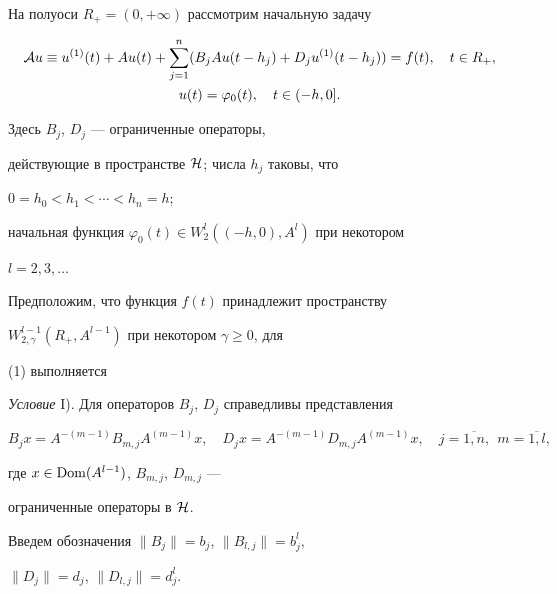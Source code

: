 На полуоси $R_+=(0,+\infty )$ рассмотрим начальную задачу


\begin{gather}


{\pA}u\equiv u^{(1)}(t)+Au(t)+\sum\limits_{j=1}^n( B_j


Au(t-h_j)+D_ju^{(1)}(t-h_j))


=f(t), \quad t\in R_+, \\


%


u(t)=\varphi_0(t), \quad t\in (-h,0].


\end{gather}


Здесь $B_j$, $D_j$ --- ограниченные операторы,


действующие в пространстве ${\cal H}$; числа $h_j$ таковы, что


$0=h_0< h_1< \dotsb <h_n=h$;


начальная функция $\varphi_0(t)\in W^l_2((-h,0),A^l)$ при некотором


$l=2,3,\dotsc$





Предположим, что функция $f(t)$ принадлежит пространству


$W^{l-1}_{2,\gamma}(R_+,A^{l-1})$ при некотором $\gamma \geq 0$, для


(1) выполняется


\medskip





{\it Условие} I). Для операторов $B_j$, $D_j$ справедливы представления


$$


B_{j}x=A^{-(m-1)}B_{m,j}A^{(m-1)}x,\quad


D_{j}x=A^{-(m-1)}D_{m,j}A^{(m-1)}x,\quad j=\overline{1,n}, \ \


m=\overline{1,l},


$$


где $x\in\operatorname{Dom}(A^{l-1})$, $B_{m,j}$, $D_{m,j}$ ---


ограниченные операторы в ${\cal H}$.


\medskip





Введем обозначения $\|B_j\| = b_j$, $\| B_{l,j}\| = b_{j}^l$,


$\|D_j\| = d_j$, $ \| D_{l,j}\| = d_{j}^l$.





